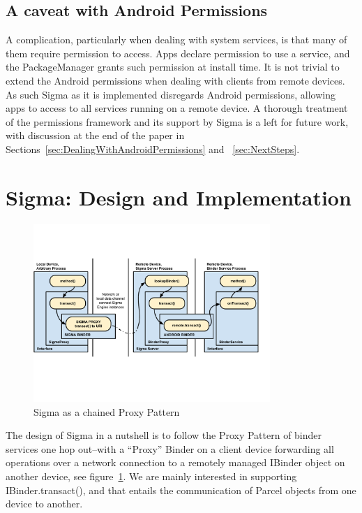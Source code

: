 \documentclass[prodmode]{acmlarge}
\begin{document}
\subsection{A caveat with Android Permissions}
A complication, particularly when dealing with system services, is that many of them require permission to access. Apps declare permission to use a service, and the PackageManager grants such permission at install time. It is not trivial to extend the Android permissions when dealing with clients from remote devices. As such Sigma as it is implemented disregards Android permissions, allowing apps to access to all services running on a remote device. A thorough treatment of the permissions framework and its support by Sigma is a left for future work, with discussion at the end of the paper in Sections~\ref{sec:DealingWithAndroidPermissions} and ~\ref{sec:NextSteps}.

\section{Sigma: Design and Implementation}
\label{sec:Sigma}
\begin{figure}[h]
\centering
\includegraphics[width=0.8\textwidth]{drawings/sigma_proxy_pattern.pdf}
\caption{Sigma as a chained Proxy Pattern}
\label{fig:SigmaChainProxy}
\end{figure}
The design of Sigma in a nutshell is to follow the Proxy Pattern of binder services one hop out--with a ``Proxy'' Binder on a client device forwarding all operations over a network connection to a remotely managed IBinder object on another device, see figure~\ref{fig:SigmaChainProxy}. We are mainly interested in supporting IBinder.transact(), and that entails the communication of Parcel objects from one device to another.
\end{document}
